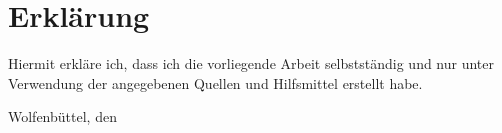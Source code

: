 \documentclass[
  a4paper,					    %
  twoside,
  DIV=calc,     				%
  bibliography=totoc,
  cleardoublepage=empty,
  ngerman,     					%
  final       					%
]{scrbook}
\begin{document}
\chapter{Erklärung}
\label{sec:Erklärung}
Hiermit erkläre ich, dass ich die vorliegende Arbeit selbstständig und nur unter Verwendung der angegebenen Quellen und Hilfsmittel erstellt habe.
\vspace{2.5cm} \par
Wolfenbüttel, den %


\glsaddall
\printglossaries


%
\nocite{*}
%
\begin{singlespace}

\end{singlespace}
\end{document}
